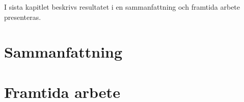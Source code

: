 I sista kapitlet beskrivs resultatet i en sammanfattning och framtida arbete presenteras.

\section{Sammanfattning}


\section{Framtida arbete}

